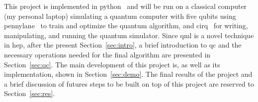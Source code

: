 This project is implemented in python~\cite{python} and will be run on a 
classical computer (my personal laptop) simulating a quantum computer with five 
qubits using pennylane~\cite{pennylane} to train and optimize the quantum 
algorithm, and cirq~\cite{cirq} for writing, manipulating, and running the 
quantum simulator.
Since \gls{qml} is a novel technique in \gls{hep}, after the present Section~\ref{sec:intro},
a brief introduction to \gls{qc} and the necessary operations needed for the 
final algorithm are presented in Section~\ref{sec:qc}. 
The main development of this project is, as well as its implementation, shown in
Section~\ref{sec:demo}.
The final results of the project and a brief discussion of futures steps to be 
built on top of this project are reserved to Section~\ref{sec:res}.